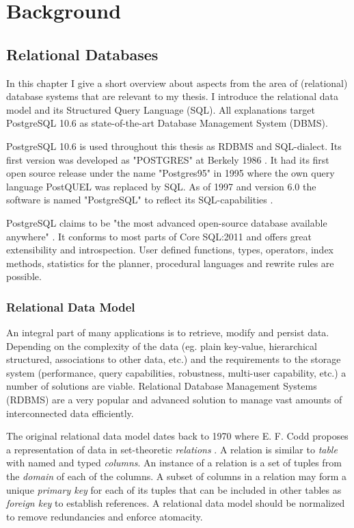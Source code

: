 \chapter{Background}\label{Introduction}

\section{Relational Databases}\label{theory}

In this chapter I give a short overview about aspects from the area of (relational) database systems that are relevant to my thesis. I introduce the relational data model and its Structured Query Language (SQL). All explanations target PostgreSQL 10.6 as state-of-the-art Database Management System (DBMS).

PostgreSQL 10.6 is used throughout this thesis as RDBMS and SQL-dialect. Its first version was developed as "POSTGRES" at Berkely 1986 \cite[xxxvi ff.]{psql}. It had its first open source release under the name "Postgres95" in 1995 where the own query language PostQUEL was replaced by SQL. As of 1997 and version 6.0 the software is named "PostgreSQL" to reflect its SQL-capabilities \cite[xxxvi ff.]{psql}.

PostgreSQL claims to be "the most advanced open-source database available anywhere" \cite[xxxvii]{psql}. It conforms to most parts of Core SQL:2011 \cite[S. 2198]{psql} and offers great extensibility and introspection. User defined functions, types, operators, index methods, statistics for the planner, procedural languages and rewrite rules are possible. 

\subsection{Relational Data Model}
An integral part of many applications is to retrieve, modify and persist data. Depending on the complexity of the data (eg. plain key-value, hierarchical structured, associations to other data, etc.) and the requirements to the storage system (performance, query capabilities, robustness, multi-user capability, etc.) a number of solutions are viable. Relational Database Management Systems (RDBMS) are a very popular and advanced solution to manage vast amounts of interconnected data efficiently.

The original relational data model dates back to 1970 where E. F. Codd proposes a representation of data in set-theoretic \textit{relations} \cite{codd}. A relation is similar to \textit{table} with named and typed \textit{columns}. An instance of a relation is a set of tuples from the \textit{domain} of each of the columns. A subset of columns in a relation may form a unique \textit{primary key} for each of its tuples that can be included in other tables as \textit{foreign key} to establish references. A relational data model should be normalized to remove redundancies and enforce atomacity.

